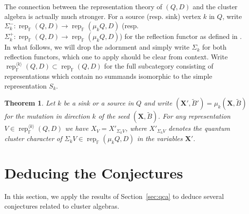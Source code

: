 \documentclass[12pt]{amsart}
\newcommand{\sayD}[1]{\say[D]{#1}}
\newtheorem{theorem}{Theorem}
\newcommand{\bfX}{\mathbf{X}}
\newcommand{\FF}{\mathbb{F}}
\newcommand{\rep}{\operatorname{rep}}
\begin{document}
  The connection between the representation theory of $(Q,D)$ and the cluster algebra is actually much stronger.
  For a source (resp. sink) vertex $k$ in $Q$, write $\Sigma_k^-:\rep_\FF(Q,D)\to\rep_\FF(\mu_kQ,D)$ (resp. $\Sigma_k^+:\rep_\FF(Q,D)\to\rep_\FF(\mu_kQ,D)$) for the reflection functor as defined in \cite[Sec. 2]{dlab-ringel}.  
  In what follows, we will drop the adornment and simply write $\Sigma_k$ for both reflection functors, which one to apply should be clear from context.
  Write $\rep_\FF^{\langle k\rangle}(Q,D)\subset\rep_\FF(Q,D)$ for the full subcategory consisting of representations which contain no summands isomorphic to the simple representation $S_k$.
  \begin{theorem}\cite{rupel1}
    \label{th:reflection functor}
    Let $k$ be a sink or a source in $Q$ and write $(\bfX',\widetilde{B}')=\mu_k(\bfX,\widetilde{B})$ for the mutation in direction $k$ of the seed $(\bfX,\widetilde{B})$.  
    For any representation $V\in\rep_\FF^{\langle k\rangle}(Q,D)$ we have $X_V=X'_{\Sigma_kV}$, where $X'_{\Sigma_kV}$ denotes the quantum cluster character of $\Sigma_kV\in\rep_\FF(\mu_kQ,D)$ in the variables $\bfX'$.
  \end{theorem}


\section{Deducing the Conjectures}
  In this section, we apply the results of Section~\ref{sec:qca} to deduce several conjectures related to cluster algebras.
  \sayD{Fill this out a little.}
\end{document}
